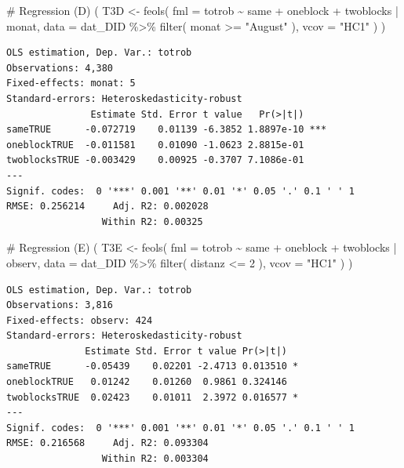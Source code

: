 \documentclass[
  a4paper,
  DIV=11,
  oneside]{scrreprt}
\newenvironment{Shaded}{\begin{snugshade}}{\end{snugshade}}
\newcommand{\AttributeTok}[1]{\textcolor[rgb]{0.40,0.45,0.13}{#1}}
\newcommand{\CommentTok}[1]{\textcolor[rgb]{0.37,0.37,0.37}{#1}}
\newcommand{\DecValTok}[1]{\textcolor[rgb]{0.68,0.00,0.00}{#1}}
\newcommand{\FunctionTok}[1]{\textcolor[rgb]{0.28,0.35,0.67}{#1}}
\newcommand{\NormalTok}[1]{\textcolor[rgb]{0.00,0.23,0.31}{#1}}
\newcommand{\OtherTok}[1]{\textcolor[rgb]{0.00,0.23,0.31}{#1}}
\newcommand{\SpecialCharTok}[1]{\textcolor[rgb]{0.37,0.37,0.37}{#1}}
\newcommand{\StringTok}[1]{\textcolor[rgb]{0.13,0.47,0.30}{#1}}
\begin{document}
\begin{Shaded}
\begin{Highlighting}[]
\CommentTok{\# Regression (D)}
\NormalTok{(}
\NormalTok{  T3D }\OtherTok{\textless{}{-}} \FunctionTok{feols}\NormalTok{(}
    \AttributeTok{fml =}\NormalTok{ totrob }\SpecialCharTok{\textasciitilde{}} 
\NormalTok{      same}
    \SpecialCharTok{+}\NormalTok{ oneblock}
    \SpecialCharTok{+}\NormalTok{ twoblocks }
    \SpecialCharTok{|}\NormalTok{ monat,}
    \AttributeTok{data =}\NormalTok{ dat\_DID }\SpecialCharTok{\%\textgreater{}\%} 
      \FunctionTok{filter}\NormalTok{(}
\NormalTok{        monat }\SpecialCharTok{\textgreater{}=} \StringTok{"August"}
\NormalTok{      ),}
    \AttributeTok{vcov =} \StringTok{"HC1"}
\NormalTok{  )}
\NormalTok{)}
\end{Highlighting}
\end{Shaded}

\begin{verbatim}
OLS estimation, Dep. Var.: totrob
Observations: 4,380
Fixed-effects: monat: 5
Standard-errors: Heteroskedasticity-robust 
               Estimate Std. Error t value   Pr(>|t|)    
sameTRUE      -0.072719    0.01139 -6.3852 1.8897e-10 ***
oneblockTRUE  -0.011581    0.01090 -1.0623 2.8815e-01    
twoblocksTRUE -0.003429    0.00925 -0.3707 7.1086e-01    
---
Signif. codes:  0 '***' 0.001 '**' 0.01 '*' 0.05 '.' 0.1 ' ' 1
RMSE: 0.256214     Adj. R2: 0.002028
                 Within R2: 0.00325 
\end{verbatim}

\begin{Shaded}
\begin{Highlighting}[]
\CommentTok{\# Regression (E)}
\NormalTok{(}
\NormalTok{  T3E }\OtherTok{\textless{}{-}} \FunctionTok{feols}\NormalTok{(}
    \AttributeTok{fml =}\NormalTok{ totrob }\SpecialCharTok{\textasciitilde{}}
\NormalTok{      same }
    \SpecialCharTok{+}\NormalTok{ oneblock }
    \SpecialCharTok{+}\NormalTok{ twoblocks }
    \SpecialCharTok{|}\NormalTok{ observ,}
    \AttributeTok{data =}\NormalTok{ dat\_DID }\SpecialCharTok{\%\textgreater{}\%} 
      \FunctionTok{filter}\NormalTok{(}
\NormalTok{        distanz }\SpecialCharTok{\textless{}=} \DecValTok{2}
\NormalTok{      ), }
    \AttributeTok{vcov =} \StringTok{"HC1"}
\NormalTok{  )}
\NormalTok{)}
\end{Highlighting}
\end{Shaded}

\begin{verbatim}
OLS estimation, Dep. Var.: totrob
Observations: 3,816
Fixed-effects: observ: 424
Standard-errors: Heteroskedasticity-robust 
              Estimate Std. Error t value Pr(>|t|)    
sameTRUE      -0.05439    0.02201 -2.4713 0.013510 *  
oneblockTRUE   0.01242    0.01260  0.9861 0.324146    
twoblocksTRUE  0.02423    0.01011  2.3972 0.016577 *  
---
Signif. codes:  0 '***' 0.001 '**' 0.01 '*' 0.05 '.' 0.1 ' ' 1
RMSE: 0.216568     Adj. R2: 0.093304
                 Within R2: 0.003304
\end{verbatim}
\end{document}

